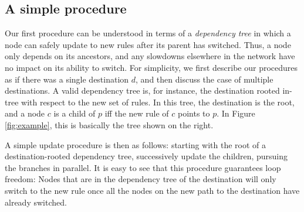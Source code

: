\subsection{A simple procedure}
\label{sec:practical}


Our first procedure can be understood in terms of a {\em dependency tree} in which a node can safely update to new rules after its parent has switched. Thus, a node only depends on its ancestors, and any slowdowns elsewhere in the network have no impact on its ability to switch.
For simplicity, we first describe our procedures as if there was a single destination $d$, and then discuss the case of multiple destinations. A valid dependency tree is, for instance, the destination rooted in-tree with respect to the new set of rules. In this tree, the destination is the root, and a node $c$ is a child of $p$ iff the new rule of $c$ points to $p$. In Figure \ref{fig:example}, this is basically the tree shown on the right.

A simple update procedure is then as follows: starting with the root of a destination-rooted dependency tree, successively update the children, pursuing the branches in parallel.
It is easy to see that this procedure guarantees loop freedom: Nodes that are in the dependency tree of the destination will only switch to the new rule once all the nodes on the new path to the destination have already switched.





